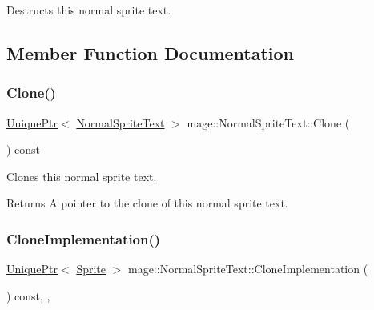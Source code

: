 Destructs this normal sprite text. 

\subsection{Member Function Documentation}
\hypertarget{classmage_1_1_normal_sprite_text_a8357ea517cff639204da4825024d9d34}{}\label{classmage_1_1_normal_sprite_text_a8357ea517cff639204da4825024d9d34} 
\subsubsection{\texorpdfstring{Clone()}{Clone()}}
{\footnotesize\ttfamily \hyperlink{namespacemage_a3316d7143a973e37adf1110f2e80ca31}{Unique\+Ptr}$<$ \hyperlink{classmage_1_1_normal_sprite_text}{Normal\+Sprite\+Text} $>$ mage\+::\+Normal\+Sprite\+Text\+::\+Clone (\begin{DoxyParamCaption}{ }\end{DoxyParamCaption}) const}

Clones this normal sprite text.

\begin{DoxyReturn}{Returns}
A pointer to the clone of this normal sprite text. 
\end{DoxyReturn}
\hypertarget{classmage_1_1_normal_sprite_text_acab5b61f8be4a475cd54b51278956e37}{}\label{classmage_1_1_normal_sprite_text_acab5b61f8be4a475cd54b51278956e37} 
\subsubsection{\texorpdfstring{Clone\+Implementation()}{CloneImplementation()}}
{\footnotesize\ttfamily \hyperlink{namespacemage_a3316d7143a973e37adf1110f2e80ca31}{Unique\+Ptr}$<$ \hyperlink{classmage_1_1_sprite}{Sprite} $>$ mage\+::\+Normal\+Sprite\+Text\+::\+Clone\+Implementation (\begin{DoxyParamCaption}{ }\end{DoxyParamCaption}) const\hspace{0.3cm}{\ttfamily [override]}, {\ttfamily [private]}, {\ttfamily [virtual]}}

